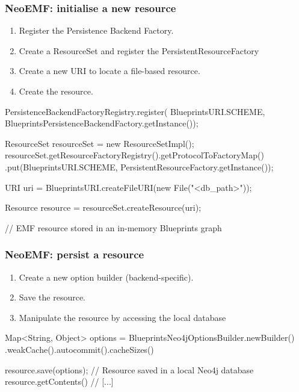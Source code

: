 \begin{frame}[fragile]\frametitle{NeoEMF: initialise a new resource}
	\begin{enumerate}
	\item Register the Persistence Backend Factory.
	\item Create a ResourceSet and register the PersistentResourceFactory
	\item Create a new URI to locate a file-based resource.
	\item Create the resource.
	\end{enumerate}
	
  \begin{java}
PersistenceBackendFactoryRegistry.register(
			BlueprintsURI.SCHEME,
			BlueprintsPersistenceBackendFactory.getInstance());  
  
ResourceSet resourceSet = new ResourceSetImpl();
resourceSet.getResourceFactoryRegistry().getProtocolToFactoryMap()
			.put(BlueprintsURI.SCHEME,
					PersistentResourceFactory.getInstance());
						
URI uri = BlueprintsURI.createFileURI(new File("<db_path>"));
						
Resource resource = resourceSet.createResource(uri);
    
// EMF resource stored in an in-memory Blueprints graph
  \end{java}
\end{frame}

\begin{frame}[fragile]\frametitle{NeoEMF: persist a resource}
	
	\begin{enumerate}
	\item Create a new option builder (backend-specific).
	\item Save the resource.
	\item Manipulate the resource by accessing the local database
	\end{enumerate}
  \begin{java}
Map<String, Object> options = BlueprintsNeo4jOptionsBuilder.newBuilder()
		.weakCache().autocommit().cacheSizes()

resource.save(options);
// Resource saved in a local Neo4j database
resource.getContents() 
// [...]
  \end{java}
	
\end{frame}

